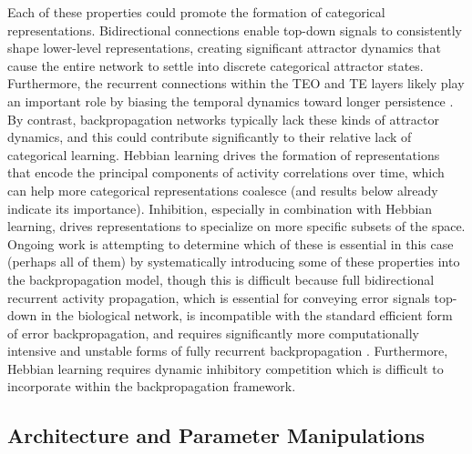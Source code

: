 \documentclass[11pt,twoside]{article}
\newif\myifpdf
\begin{document}
Each of these properties could promote the formation of categorical representations. Bidirectional connections enable top-down signals to consistently shape lower-level representations, creating significant attractor dynamics that cause the entire network to settle into discrete categorical attractor states.  Furthermore, the recurrent connections within the TEO and TE layers likely play an important role by biasing the temporal dynamics toward longer persistence \cite{ChaudhuriKnoblauchGarielEtAl15}.  By contrast, backpropagation networks typically lack these kinds of attractor dynamics, and this could contribute significantly to their relative lack of categorical learning.  Hebbian learning drives the formation of representations that encode the principal components of activity correlations over time, which can help more categorical representations coalesce (and results below already indicate its importance).  Inhibition, especially in combination with Hebbian learning, drives representations to specialize on more specific subsets of the space.  Ongoing work is attempting to determine which of these is essential in this case (perhaps all of them) by systematically introducing some of these properties into the backpropagation model, though this is difficult because full bidirectional recurrent activity propagation, which is essential for conveying error signals top-down in the biological network, is incompatible with the standard efficient form of error backpropagation, and requires significantly more computationally intensive and unstable forms of fully recurrent backpropagation \cite{WilliamsZipser92,Pineda87}.  Furthermore, Hebbian learning requires dynamic inhibitory competition which is difficult to incorporate within the backpropagation framework.

\subsection{Architecture and Parameter Manipulations}
\end{document}
